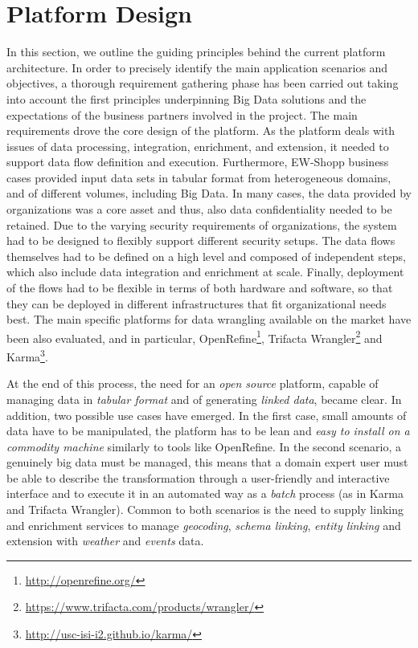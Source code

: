 \section{Platform Design}\label{sec:approach}

In this section, we outline the guiding principles behind the current platform architecture. 
In order to precisely identify the main application scenarios and objectives, a thorough requirement gathering phase has been carried out taking into account the first principles underpinning Big Data solutions and the expectations of the business partners involved in the project. The main requirements drove the core design of the platform. As the platform deals with issues of data processing, integration, enrichment, and extension, it needed to support data flow definition and execution. 
Furthermore, EW-Shopp business cases provided input data sets in tabular format from heterogeneous domains, and of different volumes, including Big Data. In many cases, the data provided by organizations was a core asset and thus, also data confidentiality needed to be retained. 
Due to the varying security requirements of organizations, the system had to be designed to flexibly support different security setups. The data flows themselves had to be defined on a high level and composed of independent steps, which also include data integration and enrichment at scale. Finally, deployment of the flows had to be flexible in terms of both hardware and software, so that they can be deployed in different infrastructures that fit organizational needs best.
The main specific platforms for data wrangling available on the market have been also evaluated, and in particular, OpenRefine\footnote{\url{http://openrefine.org/}}, Trifacta Wrangler\footnote{\url{https://www.trifacta.com/products/wrangler/}} and Karma\footnote{\url{http://usc-isi-i2.github.io/karma/}}. 

At the end of this process, the need for an \textit{open source} platform, capable of managing data in \textit{tabular format} and of generating \textit{linked data}, became clear. 
In addition, two possible use cases have emerged. In the first case, small amounts of data have to be manipulated, the platform has to be lean and \textit{easy to install on a commodity machine} similarly to tools like OpenRefine. In the second scenario, a genuinely big data must be managed, this means that a domain expert user must be able to describe the transformation through a user-friendly and interactive interface and to execute it in an automated way as a \textit{batch} process (as in Karma and Trifacta Wrangler). 
Common to both scenarios is the need to supply linking and enrichment services to manage \textit{geocoding}, \textit{schema linking}, \textit{entity linking} and extension with \textit{weather} and \textit{events} data. 

